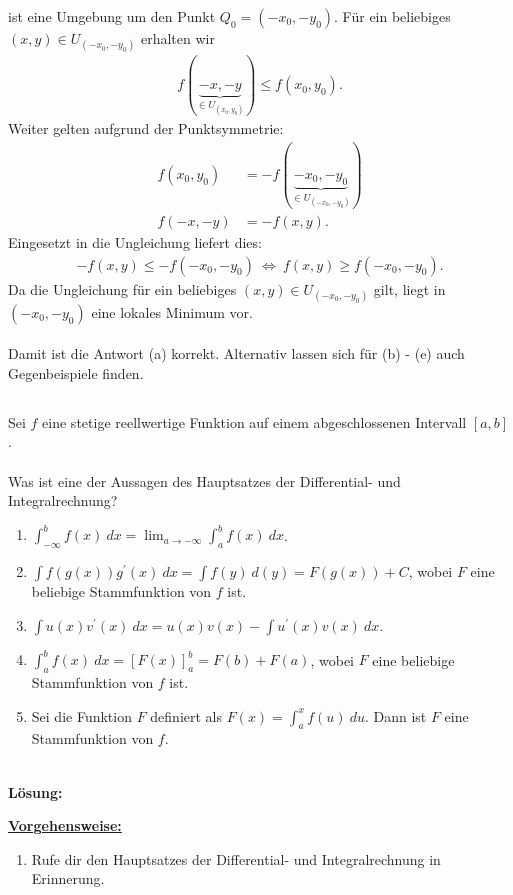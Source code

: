 ist eine Umgebung um den Punkt $Q_0 = (-x_0,-y_0)$.
Für ein beliebiges $(x,y) \in U_{(-x_0,-y_0)}  $ erhalten wir
\begin{align*}
	f(\underbrace{-x,-y}_{\in U_{(x_0,y_0) }}) \leq f(x_0, y_0). 
\end{align*}
Weiter gelten aufgrund der Punktsymmetrie:
\begin{align*}
	f(x_0, y_0) &= - f(\underbrace{-x_0,-y_0}_{\in U_{(-x_0,-y_0) }})\\
	f(-x,-y)  &= -f(x,y).
\end{align*}
Eingesetzt in die Ungleichung liefert dies:
\begin{align*}
	-f(x,y) \leq - f(-x_0, -y_0)
	\ \Leftrightarrow \
	f(x,y) \geq f(-x_0,-y_0).
\end{align*}
Da die Ungleichung für ein beliebiges $(x,y) \in U_{(-x_0,-y_0)} $ gilt, liegt in $(-x_0,-y_0)$ eine lokales Minimum vor.\\
\\
Damit ist die Antwort (a) korrekt. Alternativ lassen sich für (b) - (e) auch Gegenbeispiele finden.

\newpage
\subsection*{}
Sei $f$ eine stetige reellwertige Funktion auf einem abgeschlossenen Intervall $[a,b]$.\\
\\
Was ist eine der Aussagen des Hauptsatzes der Differential- und Integralrechnung?
\renewcommand{\labelenumi}{(\alph{enumi})}
\begin{enumerate}
	\item 
	$\int_{-\infty}^b f(x) \ dx = 
	\lim_{a \to -\infty} \int_{a}^b f(x) \ dx
	$.
	\item 
	$\int f(g(x)) g^\prime(x) \ dx
	= \int f(y) \ d(y)
	= F(g(x) ) + C
	$, wobei $F$ eine beliebige Stammfunktion von $f$ ist.
	\item 
	$\int u(x) v^\prime(x) \ dx = u(x) v(x)  - \int u^\prime(x) v(x) \ dx$.
	\item 
	$\int_a^b f(x) \ dx
	=\left[F(x)\right]_a^b= F(b) +F(a)
	$, wobei $F$ eine beliebige Stammfunktion von $f$ ist.
	\item 
	Sei die Funktion $F$ definiert als $F(x) = \int_a^x f(u) \ du$.
	Dann ist $F$ eine Stammfunktion von $f$.
\end{enumerate}
\ \\
\textbf{Lösung:}
\begin{mdframed}
\underline{\textbf{Vorgehensweise:}}
\renewcommand{\labelenumi}{\theenumi.}
\begin{enumerate}
\item Rufe dir den Hauptsatzes der Differential- und Integralrechnung in Erinnerung.
\end{enumerate}
\end{mdframed}

